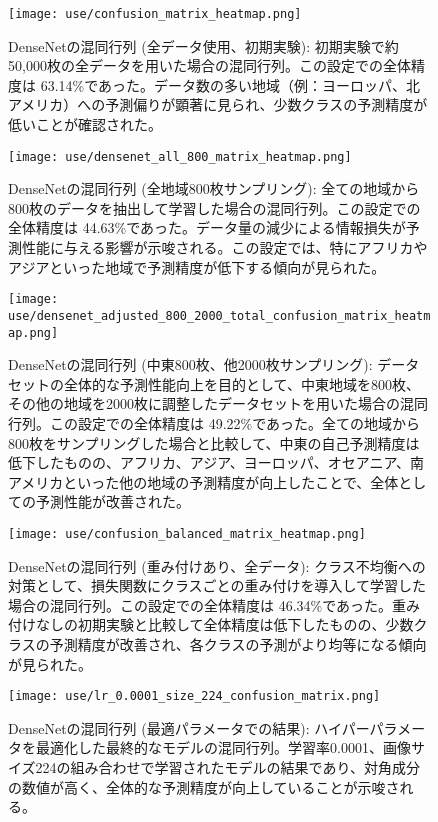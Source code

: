 \documentclass[a4paper, 11pt, titlepage]{jsarticle}
\begin{document}
\begin{figure}[H]
  \centering
  \texttt{[image: use/confusion\_matrix\_heatmap.png]}
  \caption{DenseNetの混同行列 (全データ使用、初期実験): 初期実験で約50,000枚の全データを用いた場合の混同行列。この設定での全体精度は 63.14\%であった。データ数の多い地域（例：ヨーロッパ、北アメリカ）への予測偏りが顕著に見られ、少数クラスの予測精度が低いことが確認された。}
  \label{fig:conf_matrix_all_data}
\end{figure}

\begin{figure}[H]
  \centering
  \texttt{[image: use/densenet\_all\_800\_matrix\_heatmap.png]}
  \caption{DenseNetの混同行列 (全地域800枚サンプリング): 全ての地域から800枚のデータを抽出して学習した場合の混同行列。この設定での全体精度は 44.63\%であった。データ量の減少による情報損失が予測性能に与える影響が示唆される。この設定では、特にアフリカやアジアといった地域で予測精度が低下する傾向が見られた。}
  \label{fig:conf_matrix_all_800}
\end{figure}

\begin{figure}[H]
  \centering
  \texttt{[image: use/densenet\_adjusted\_800\_2000\_total\_confusion\_matrix\_heatmap.png]}
  \caption{DenseNetの混同行列 (中東800枚、他2000枚サンプリング): データセットの全体的な予測性能向上を目的として、中東地域を800枚、その他の地域を2000枚に調整したデータセットを用いた場合の混同行列。この設定での全体精度は 49.22\%であった。全ての地域から800枚をサンプリングした場合と比較して、中東の自己予測精度は低下したものの、アフリカ、アジア、ヨーロッパ、オセアニア、南アメリカといった他の地域の予測精度が向上したことで、全体としての予測性能が改善された。}
  \label{fig:conf_matrix_adjusted_data}
\end{figure}

\begin{figure}[H]
  \centering
  \texttt{[image: use/confusion\_balanced\_matrix\_heatmap.png]}
  \caption{DenseNetの混同行列 (重み付けあり、全データ): クラス不均衡への対策として、損失関数にクラスごとの重み付けを導入して学習した場合の混同行列。この設定での全体精度は 46.34\%であった。重み付けなしの初期実験と比較して全体精度は低下したものの、少数クラスの予測精度が改善され、各クラスの予測がより均等になる傾向が見られた。}
  \label{fig:conf_matrix_balanced}
\end{figure}

\begin{figure}[H]
  \centering
  \texttt{[image: use/lr\_0.0001\_size\_224\_confusion\_matrix.png]}
  \caption{DenseNetの混同行列 (最適パラメータでの結果): ハイパーパラメータを最適化した最終的なモデルの混同行列。学習率0.0001、画像サイズ224の組み合わせで学習されたモデルの結果であり、対角成分の数値が高く、全体的な予測精度が向上していることが示唆される。}
  \label{fig:conf_matrix_optimal_param}
\end{figure}
\end{document}
